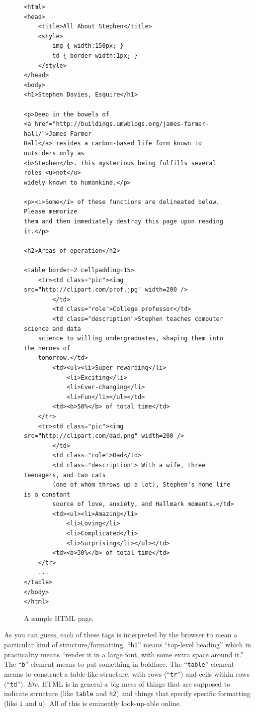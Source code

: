 \begin{figure}
\begin{Verbatim}[fontsize=\scriptsize,samepage=true,frame=lines]
<html>
<head>
    <title>All About Stephen</title>
    <style>
        img { width:150px; }
        td { border-width:1px; }
    </style>
</head>
<body>
<h1>Stephen Davies, Esquire</h1>

<p>Deep in the bowels of
<a href="http://buildings.umwblogs.org/james-farmer-hall/">James Farmer
Hall</a> resides a carbon-based life form known to outsiders only as
<b>Stephen</b>. This mysterious being fulfills several roles <u>not</u>
widely known to humankind.</p>

<p><i>Some</i> of these functions are delineated below. Please memorize
them and then immediately destroy this page upon reading it.</p>

<h2>Areas of operation</h2>

<table border=2 cellpadding=15>
    <tr><td class="pic"><img src="http://clipart.com/prof.jpg" width=200 />
        </td>
        <td class="role">College professor</td>
        <td class="description">Stephen teaches computer science and data
    science to willing undergraduates, shaping them into the heroes of
    tomorrow.</td>
        <td><ul><li>Super rewarding</li>
            <li>Exciting</li>
            <li>Ever-changing</li>
            <li>Fun</li></ul></td>
        <td><b>50%</b> of total time</td>
    </tr>
    <tr><td class="pic"><img src="http://clipart.com/dad.png" width=200 />
        </td>
        <td class="role">Dad</td>
        <td class="description"> With a wife, three teenagers, and two cats
        (one of whom throws up a lot), Stephen's home life is a constant
        source of love, anxiety, and Hallmark moments.</td>
        <td><ul><li>Amazing</li>
            <li>Loving</li>
            <li>Complicated</li>
            <li>Surprising</li></ul></td>
        <td><b>30%</b> of total time</td>
    </tr>
    ...
</table>
</body>
</html>
\end{Verbatim}
\caption{A sample HTML page.}
\label{fig:allAboutStephen}
\end{figure}


As you can guess, each of these tags is interpreted by the browser to mean a
particular kind of structure/formatting. ``\texttt{h1}'' means ``top-level
heading'' which in practicality means ``render it in a large font, with some
extra space around it.'' The ``\texttt{b}'' element means to put something in
boldface. The ``\texttt{table}'' element means to construct a table-like
structure, with rows (``\texttt{tr}'') and cells within rows (``\texttt{td}'').
\textit{Etc.} HTML is in general a big mess of things that are supposed to
indicate structure (like \texttt{table} and \texttt{h2}) and things that
specify specific formatting (like \texttt{i} and \texttt{u}). All of this is
eminently look-up-able online.


